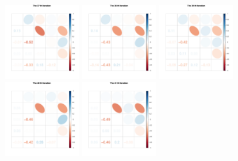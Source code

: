 \begin{figure}[h]\ContinuedFloat
\centering
\includegraphics[width=0.3\textwidth,height=0.2\textheight]{Chapters/05MCMCOU/plots/paraEvolution/corMatrix37.pdf}
\includegraphics[width=0.3\textwidth,height=0.2\textheight]{Chapters/05MCMCOU/plots/paraEvolution/corMatrix38.pdf}
\includegraphics[width=0.3\textwidth,height=0.2\textheight]{Chapters/05MCMCOU/plots/paraEvolution/corMatrix39.pdf}
\includegraphics[width=0.3\textwidth,height=0.2\textheight]{Chapters/05MCMCOU/plots/paraEvolution/corMatrix40.pdf}
\includegraphics[width=0.3\textwidth,height=0.2\textheight]{Chapters/05MCMCOU/plots/paraEvolution/corMatrix41.pdf}

\end{figure}
